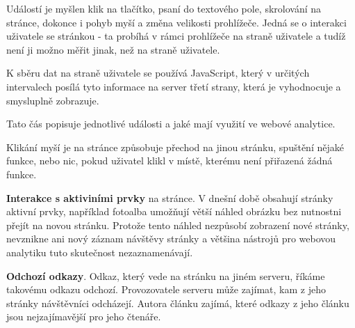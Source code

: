 \documentclass[bc,female,java,dept456]{diploma}						%
\begin{document}

Událostí je myšlen klik na tlačítko, psaní do textového pole, skrolování na stránce, dokonce i pohyb myší a změna velikosti prohlížeče. Jedná se o interakci uživatele se stránkou - ta probíhá v rámci prohlížeče na straně uživatele a tudíž není ji možno měřit jinak, než na straně uživatele.

K sběru dat na straně uživatele se používá JavaScript, který v určitých intervalech posílá tyto informace na server třetí strany, která je vyhodnocuje a smysluplně zobrazuje.

Tato čás popisuje jednotlivé události a jaké mají využití ve webové analytice.






Klikání myší je na stránce způsobuje přechod na jinou stránku, spuštění nějaké funkce, nebo nic, pokud uživatel klikl v místě, kterému není přiřazená žádná funkce.

{\bf Interakce s aktiviními prvky} na stránce. V dnešní době obsahují stránky aktivní prvky, například fotoalba umožňují větší náhled obrázku bez nutnostni přejít na novou stránku. Protože tento náhled nezpůsobí zobrazení nové stránky, nevznikne ani nový záznam návštěvy stránky a většina nástrojů pro webovou analytiku tuto skutečnost nezaznamenávají.

{\bf Odchozí odkazy}. Odkaz, který vede na stránku na jiném serveru, říkáme takovému odkazu odchozí. Provozovatele serveru může zajímat, kam z jeho stránky návštěvníci odcházejí. Autora článku zajímá, které odkazy z jeho článku jsou nejzajímavější pro jeho čtenáře.
\end{document}
